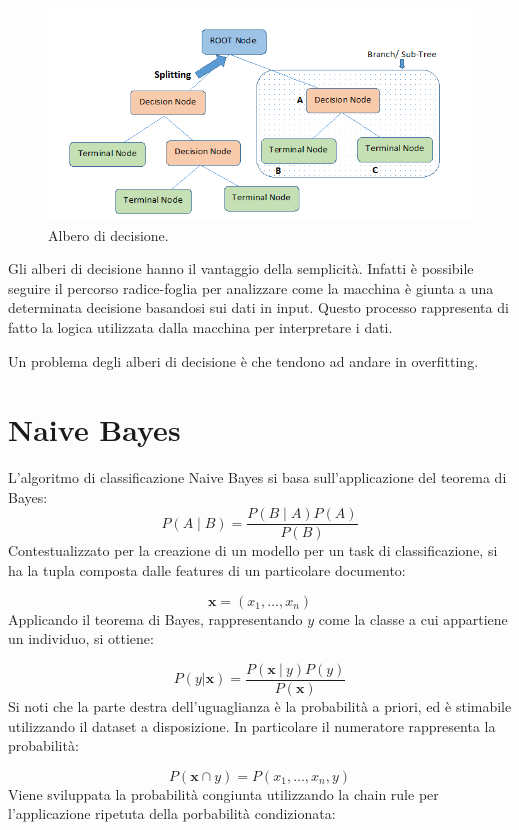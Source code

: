 \documentclass[oneside]{book}
\begin{document}
\begin{figure}[!h]
	\centering
	\includegraphics[width=13cm]{assets/decision_tree.png}
	\caption[Caption for LOF]{Albero di decisione.\footnotemark}
	\label{fig:decision-tree}
\end{figure}




Gli alberi di decisione hanno il vantaggio della semplicità. Infatti è possibile seguire il percorso radice-foglia per analizzare come la macchina è giunta a una determinata decisione basandosi sui dati in input. Questo processo rappresenta di fatto la logica utilizzata dalla macchina per interpretare i dati.

Un problema degli alberi di decisione è che tendono ad andare in overfitting.

\newpage
\section{Naive Bayes}
L'algoritmo di classificazione Naive Bayes si basa sull'applicazione del teorema di Bayes:
$$P(A \mid B) = \frac{P(B \mid A)P(A)}{P(B)}$$
Contestualizzato per la creazione di un modello per un task di classificazione, si ha la tupla composta dalle features di un particolare documento:

$$\textbf{x} = (x_1, ..., x_n)$$
Applicando il teorema di Bayes, rappresentando $y$ come la classe a cui appartiene un individuo, si ottiene:

$$P(y|\textbf{x}) =
\frac{P(\textbf{x}\ |\ y)P(y)}{P(\textbf{x})}$$
Si noti che la parte destra dell'uguaglianza è la probabilità a priori, ed è stimabile utilizzando il dataset a disposizione. In particolare il numeratore rappresenta la probabilità:

$$P(\textbf{x} \cap y) = P(x_1, ..., x_n, y)$$
Viene sviluppata la probabilità congiunta utilizzando la chain rule per l'applicazione ripetuta della porbabilità condizionata:
\end{document}
